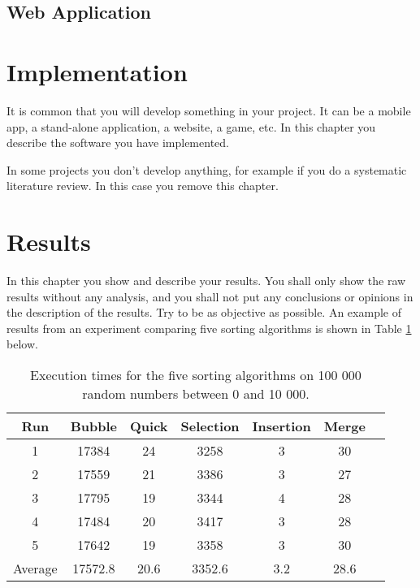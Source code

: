 \documentclass[a4paper,12pt]{article}
\begin{document}
\subsection{Web Application}
\subsubsection{}

\newpage

\section{Implementation}
It is common that you will develop something in your project. It can be a mobile app, a stand-alone application, a website, a game, etc. In this chapter you describe the software you have implemented. 

In some projects you don't develop anything, for example if you do a systematic literature review. In this case you remove this chapter.

\newpage

\section{Results}
In this chapter you show and describe your results. You shall only show the raw results without any analysis, and you shall not put any conclusions or opinions in the description of the results. Try to be as objective as possible. An example of results from an experiment comparing five sorting algorithms is shown in Table \ref{results} below.\\

\begin{center}
\begin{table}[ht]
\begin{center}
\begin{tabular}{ccccccc}
\hline
Run & Bubble & Quick & Selection & Insertion & Merge \\
\hline
1 & 17384 & 24 & 3258 & 3 & 30 \\
2 & 17559 & 21 & 3386 & 3 & 27 \\
3 & 17795 & 19 & 3344 & 4 & 28 \\
4 & 17484 & 20 & 3417 & 3 & 28 \\
5 & 17642 & 19 & 3358 & 3 & 30 \\
\hline
Average & 17572.8 & 20.6 & 3352.6 & 3.2 & 28.6 \\
\hline
%
\end{tabular}
\end{center}
\caption{Execution times for the five sorting algorithms on 100 000 random numbers between 0 and 10 000.}
\label{results}
\end{table}
\end{center}
\end{document}
